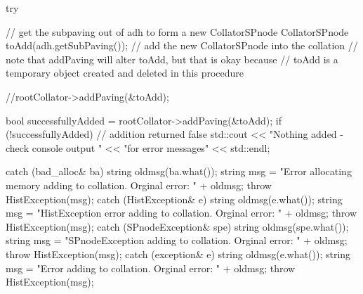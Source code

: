 \begin{DoxyCode}
{
    try {
        // get the subpaving out of adh to form a new CollatorSPnode
        CollatorSPnode toAdd(adh.getSubPaving());
        // add the new CollatorSPnode into the collation
        // note that addPaving will alter toAdd, but that is okay because
        // toAdd is a temporary object created and deleted in this procedure

        //rootCollator->addPaving(&toAdd);

        bool successfullyAdded = rootCollator->addPaving(&toAdd);
        if (!successfullyAdded) { // addition returned false
            std::cout << "Nothing added - check console output "
                << "for error messages" << std::endl;
        }
    }
    catch (bad_alloc& ba) {
        string oldmsg(ba.what());
        string msg = "Error allocating memory adding to collation.  Orginal
       error: "
                                            + oldmsg;
        throw HistException(msg);
    }
    catch (HistException& e) {
        string oldmsg(e.what());
        string msg = "HistException error adding to collation.  Orginal error: 
      " + oldmsg;
        throw HistException(msg);
    }
    catch (SPnodeException& spe) {
        string oldmsg(spe.what());
        string msg = "SPnodeException adding to collation.  Orginal error: " + 
      oldmsg;
        throw HistException(msg);
    }
    catch (exception& e) {
        string oldmsg(e.what());
        string msg = "Error adding to collation.  Orginal error: " + oldmsg;
        throw HistException(msg);
    }
}
\end{DoxyCode}
